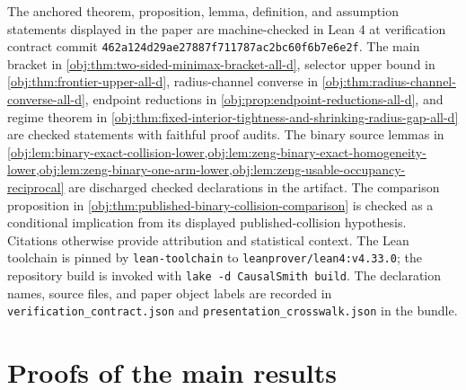 \documentclass[11pt]{article}
\begin{document}
The anchored theorem, proposition, lemma, definition, and assumption statements displayed in the paper are machine-checked in Lean 4 at verification contract commit \texttt{462a124d29ae27887f711787ac2bc60f6b7e6e2f}. The main bracket in \cref{obj:thm:two-sided-minimax-bracket-all-d}, selector upper bound in \cref{obj:thm:frontier-upper-all-d}, radius-channel converse in \cref{obj:thm:radius-channel-converse-all-d}, endpoint reductions in \cref{obj:prop:endpoint-reductions-all-d}, and regime theorem in \cref{obj:thm:fixed-interior-tightness-and-shrinking-radius-gap-all-d} are checked statements with faithful proof audits. The binary source lemmas in \cref{obj:lem:binary-exact-collision-lower,obj:lem:zeng-binary-exact-homogeneity-lower,obj:lem:zeng-binary-one-arm-lower,obj:lem:zeng-usable-occupancy-reciprocal} are discharged checked declarations in the artifact. The comparison proposition in \cref{obj:thm:published-binary-collision-comparison} is checked as a conditional implication from its displayed published-collision hypothesis. Citations otherwise provide attribution and statistical context. The Lean toolchain is pinned by \texttt{lean-toolchain} to \texttt{leanprover/lean4:v4.33.0}; the repository build is invoked with \texttt{lake -d CausalSmith build}. The declaration names, source files, and paper object labels are recorded in \texttt{verification\_contract.json} and \texttt{presentation\_crosswalk.json} in the bundle.


\section{Proofs of the main results}\label{sec:deferred-proofs}
\end{document}
